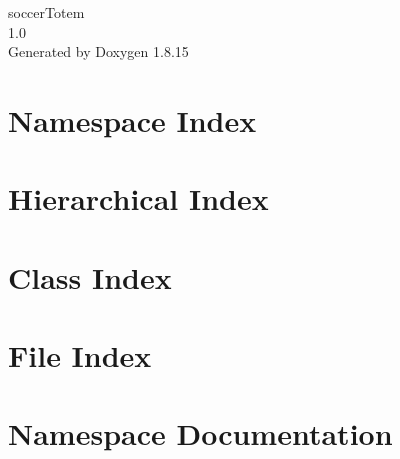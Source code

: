 \let\mypdfximage\pdfximage\def\pdfximage{\immediate\mypdfximage}\documentclass[twoside]{book}
\newcommand{\+}{\discretionary{\mbox{\scriptsize$\hookleftarrow$}}{}{}}
\newcommand{\clearemptydoublepage}{%
  \newpage{\pagestyle{empty}\cleardoublepage}%
}
\begin{document}
\hypersetup{pageanchor=false,
             bookmarksnumbered=true,
             pdfencoding=unicode
            }
\begin{titlepage}
\vspace*{7cm}
\begin{center}%
{\Large soccer\+Totem \\[1ex]\large 1.\+0 }\\
\vspace*{1cm}
{\large Generated by Doxygen 1.8.15}\\
\end{center}
\end{titlepage}
\clearemptydoublepage
{}
\tableofcontents
\clearemptydoublepage
{}
\hypersetup{pageanchor=true}

\chapter{Namespace Index}

\chapter{Hierarchical Index}

\chapter{Class Index}

\chapter{File Index}

\chapter{Namespace Documentation}






\end{document}
